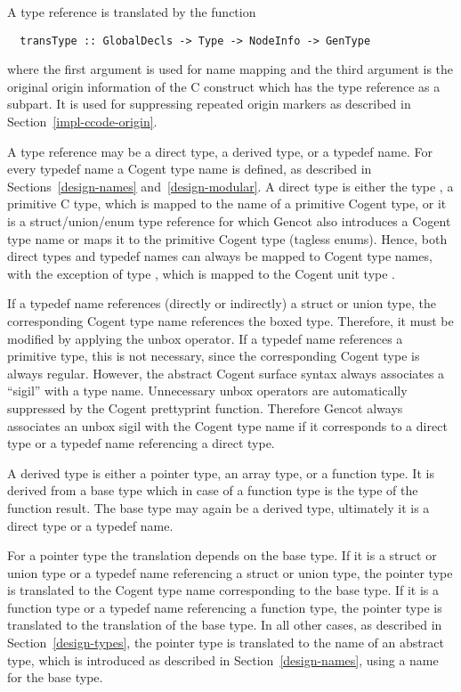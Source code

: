 A type reference is translated by the function
\begin{verbatim}
  transType :: GlobalDecls -> Type -> NodeInfo -> GenType 
\end{verbatim}
where the first argument is used for name mapping and the third argument is the original origin information of
the C construct which has the type reference as a subpart. It is used for suppressing repeated origin markers
as described in Section~\ref{impl-ccode-origin}.

A type reference may be a direct type, a derived type, or a typedef name. For every typedef name a Cogent type
name is defined, as described in Sections~\ref{design-names} and~\ref{design-modular}. A direct type is either
the type , a primitive C type, which is mapped to the name of a primitive Cogent type, or it is a 
struct/union/enum type reference for which Gencot also introduces a Cogent type name or maps it to the 
primitive Cogent type  (tagless enums). Hence, both direct types and typedef names can always be mapped
to Cogent type names, with the exception of type , which is mapped to the Cogent unit type \code{()}.

If a typedef name references (directly or indirectly) a struct or union type, the corresponding Cogent
type name references the boxed type. Therefore, it must be modified by applying the unbox operator. If a typedef
name references a primitive type, this is not necessary, since the corresponding Cogent type is always regular.
However, the abstract Cogent surface syntax always associates a ``sigil'' with a type name. Unnecessary
unbox operators are automatically suppressed by the Cogent prettyprint function. Therefore Gencot always 
associates an unbox sigil with the Cogent type name if it corresponds to a direct type or a typedef name
referencing a direct type.

A derived type is either a pointer type, an array type, or a function type. It is derived from a base type
which in case of a function type is the type of the function result. The base type may again be a derived
type, ultimately it is a direct type or a typedef name.

For a pointer type the translation depends on the base type. If it is a struct or union type or a typedef
name referencing a struct or union type, the pointer type is translated to the Cogent type name corresponding
to the base type. If it is a function type or a typedef name referencing a function type, the pointer type 
is translated to the translation of the base type. In all other cases, as described in Section~\ref{design-types}, 
the pointer type is translated to the name of an abstract type, which is introduced as described in 
Section~\ref{design-names}, using a name for the base type. 

